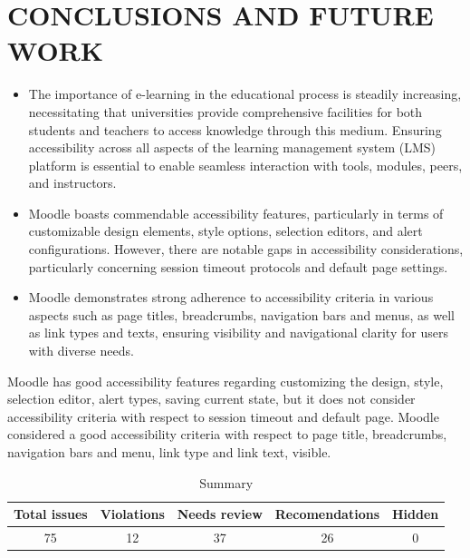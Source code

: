 \documentclass{IEEEtran}
\begin{document}
\section{CONCLUSIONS AND FUTURE WORK}
\begin{itemize}
    \item The importance of e-learning in the educational process is steadily increasing, necessitating that universities provide comprehensive facilities for both students and teachers to access knowledge through this medium. Ensuring accessibility across all aspects of the learning management system (LMS) platform is essential to enable seamless interaction with tools, modules, peers, and instructors.
    \item Moodle boasts commendable accessibility features, particularly in terms of customizable design elements, style options, selection editors, and alert configurations. However, there are notable gaps in accessibility considerations, particularly concerning session timeout protocols and default page settings.
    \item Moodle demonstrates strong adherence to accessibility criteria in various aspects such as page titles, breadcrumbs, navigation bars and menus, as well as link types and texts, ensuring visibility and navigational clarity for users with diverse needs.
\end{itemize}
Moodle has good accessibility features regarding customizing the design, style, selection editor, alert types, saving current state, but it does not consider accessibility criteria with respect to session timeout and default page.  
Moodle considered a good accessibility criteria with respect to page title, breadcrumbs, navigation bars and menu, link type and link text, visible.

\vspace{1cm}


\begin{table}[h]
    \centering
    \caption{Summary}
    \label{tab:tab1}
    \begin{tabular}{|c|c|c|c|c|}
        \hline
        Total issues & Violations & Needs review & Recomendations & Hidden \\
        \hline
        75 & 12 & 37 & 26 & 0 \\
        \hline
    \end{tabular}
\end{table}


\nocite{}



    
\end{document}
